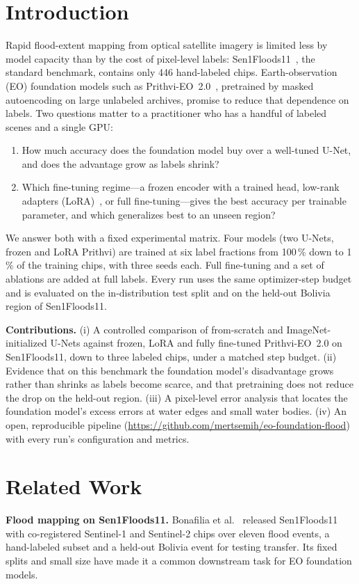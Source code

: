 \documentclass[conference]{IEEEtran}
\begin{document}
\section{Introduction}
Rapid flood-extent mapping from optical satellite imagery is limited less by model capacity than by the cost of pixel-level labels: Sen1Floods11~\cite{bonafilia2020sen1floods11}, the standard benchmark, contains only 446 hand-labeled chips. Earth-observation (EO) foundation models such as Prithvi-EO~2.0~\cite{szwarcman2024prithvi}, pretrained by masked autoencoding on large unlabeled archives, promise to reduce that dependence on labels. Two questions matter to a practitioner who has a handful of labeled scenes and a single GPU:
\begin{enumerate}
  \item How much accuracy does the foundation model buy over a well-tuned U-Net, and does the advantage grow as labels shrink?
  \item Which fine-tuning regime---a frozen encoder with a trained head, low-rank adapters (LoRA)~\cite{hu2021lora}, or full fine-tuning---gives the best accuracy per trainable parameter, and which generalizes best to an unseen region?
\end{enumerate}
We answer both with a fixed experimental matrix. Four models (two U-Nets, frozen and LoRA Prithvi) are trained at six label fractions from 100\,\% down to 1\,\% of the training chips, with three seeds each. Full fine-tuning and a set of ablations are added at full labels. Every run uses the same optimizer-step budget and is evaluated on the in-distribution test split and on the held-out Bolivia region of Sen1Floods11.

\textbf{Contributions.} (i) A controlled comparison of from-scratch and ImageNet-initialized U-Nets against frozen, LoRA and fully fine-tuned Prithvi-EO~2.0 on Sen1Floods11, down to three labeled chips, under a matched step budget. (ii) Evidence that on this benchmark the foundation model's disadvantage grows rather than shrinks as labels become scarce, and that pretraining does not reduce the drop on the held-out region. (iii) A pixel-level error analysis that locates the foundation model's excess errors at water edges and small water bodies. (iv) An open, reproducible pipeline (\url{https://github.com/mertsemih/eo-foundation-flood}) with every run's configuration and metrics.

\section{Related Work}
\textbf{Flood mapping on Sen1Floods11.} Bonafilia et al.~\cite{bonafilia2020sen1floods11} released Sen1Floods11 with co-registered Sentinel-1 and Sentinel-2 chips over eleven flood events, a hand-labeled subset and a held-out Bolivia event for testing transfer. Its fixed splits and small size have made it a common downstream task for EO foundation models.
\end{document}
